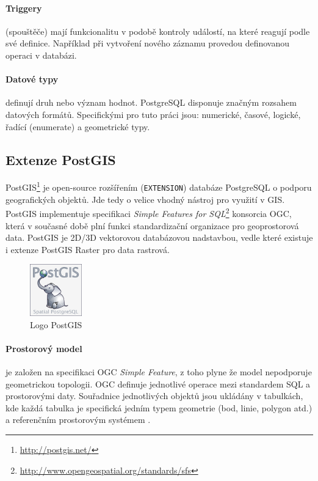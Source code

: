 \documentclass[a4paper,12pt,oneside]{report}
\begin{document}
\paragraph*{Triggery} (spouštěče) mají funkcionalitu v podobě kontroly
událostí, na které reagují podle své definice. Například při vytvoření
nového záznamu provedou definovanou operaci v databázi.

\paragraph*{Datové typy} definují druh nebo význam hodnot.
PostgreSQL disponuje značným rozsahem datových formátů. Specifickými pro tuto
práci jsou: numerické, časové, logické, řadící (enumerate) a
geometrické typy.

\subsection{Extenze PostGIS}
PostGIS\footnote{\url{http://postgis.net/}} je open-source rozšířením
(\texttt{EXTENSION}) databáze PostgreSQL o podporu geografických
objektů. Jde tedy o velice vhodný nástroj pro využití v GIS. PostGIS
implementuje specifikaci \textit{Simple Features for
  SQL}\footnote{\url{http://www.opengeospatial.org/standards/sfs} }
konsorcia \acs{OGC}, která v současné době plní funkci standardizační
organizace pro geoprostorová data. PostGIS je 2D/3D vektorovou
databázovou nadstavbou, vedle které existuje i extenze PostGIS Raster pro data rastrová.

  
\begin{figure}[h!]
    \centering
    \includegraphics[width=0.2\textwidth]{./img/implementace/postgis.png}
    \caption[Logo PostGIS]{\centering  Logo PostGIS \footnotemark}
 \end{figure}   

\paragraph*{Prostorový model} 
je založen na specifikaci    \acs{OGC} \textit{Simple Feature}, z toho
plyne že model nepodporuje geometrickou topologii. OGC definuje
jednotlivé operace mezi standardem SQL a prostorovými daty. Souřadnice
jednotlivých objektů jsou ukládány v tabulkách, kde každá tabulka je
specifická jedním typem geometrie (bod, linie, polygon atd.) a
referenčním prostorovým systémem \cite{postgis}. 
\end{document}
